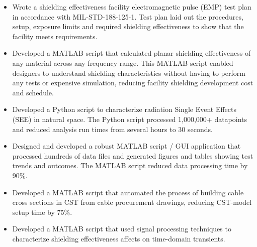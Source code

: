 \documentclass[letterpaper,12pt]{article}
\makeatletter
\newcommand{\simpleHeading}[2]{
    \vspace{-1pt}
    \begin{tabular*}{0.99\textwidth}[t]{l@{\extracolsep{\fill}}r}
        #1 & #2 \\
    \end{tabular*}
}
\newcommand{\positionHeading}[4]{
    \simpleHeading{\textbf{#1}}{\textit{#2}}
    \simpleHeading{\textit{#3}}{\textit{#4}}
}
\newcommand{\simpleParagraph}[1]{
    \vspace{-1pt}
    \begin{adjustwidth}{7pt}{0pt}
        #1
    \end{adjustwidth}
}
\newcommand{\matlab}[0]{
    MATLAB
}
\makeatother
\begin{document}
    \simpleParagraph{
        \begin{itemize}
            \item Wrote a shielding effectiveness facility electromagnetic pulse (EMP) test plan in
                accordance with MIL-STD-188-125-1. Test plan laid out the procedures, setup, exposure
                limits and required shielding effectiveness to show that the facility meets requirements.

            \item Developed a \matlab script that calculated planar shielding effectiveness of any
                material across any frequency range. This MATLAB script enabled designers to understand
                shielding characteristics without having to perform any tests or expensive simulation,
                reducing facility shielding development cost and schedule.

            \item Developed a Python script to characterize radiation Single Event Effects (SEE) in
                natural space. The Python script processed 1,000,000+ datapoints and reduced analysis
                run times from several hours to 30 seconds.

            \item Designed and developed a robust MATLAB script / GUI application that processed hundreds
                of data files and generated figures and tables showing test trends and outcomes. The
                MATLAB script reduced data processing time by 90\%.

            \item Developed a MATLAB script that automated the process of building cable cross sections
                in CST from cable procurement drawings, reducing CST-model setup time by 75\%.

            \item Developed a MATLAB script that used signal processing techniques to characterize
                shielding effectiveness affects on time-domain transients.


        \end{itemize}
    }


\end{document}
